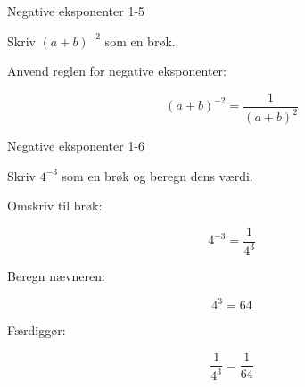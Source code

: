 \documentclass{article}
\begin{document}
\newpage

\begin{exercise}{Negative eksponenter 1-5}

Skriv $(a + b)^{-2}$ som en brøk.


\hint

Anvend reglen for negative eksponenter:

\hint
\[
(a + b)^{-2} = \frac{1}{(a + b)^2}
\]

\end{exercise}

\newpage

\begin{exercise}{Negative eksponenter 1-6}

Skriv $4^{-3}$ som en brøk og beregn dens værdi.


\hint

Omskriv til brøk:

\hint
\[
4^{-3} = \frac{1}{4^3}
\]

\hint

Beregn nævneren:

\hint
\[
4^3 = 64
\]

\hint

Færdiggør:

\hint
\[
\frac{1}{4^3} = \frac{1}{64}
\]

\end{exercise}
\end{document}
